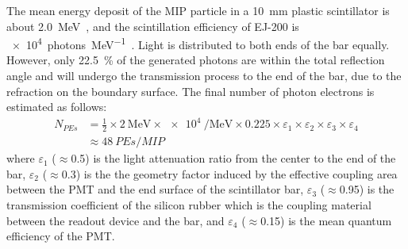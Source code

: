 \documentclass[preprint, times]{elsarticle}
\begin{document}
The mean energy deposit of the MIP particle in a \SI{10}{\milli\meter} plastic scintillator is about \SI{2.0}{\mega\electronvolt}~\cite{olive_review_2014}, and the scintillation efficiency of EJ-200 is \SI[per-mode=symbol]{e4}{photons\per\mega\electronvolt}~\cite{scintillator}.
Light is distributed to both ends of the bar equally.
However, only \SI{22.5}{\percent} of the generated photons are within the total reflection angle and will undergo the transmission process to the end of the bar, due to the refraction on the boundary surface.
The final number of photon electrons is estimated as follows:
\begin{align}
 N_{PEs} &= \frac{1}{2} \times \SI[per-mode=symbol]{2}{\mega\electronvolt} \times \SI{e4}{\per\mega\electronvolt} \times 0.225
           \times \varepsilon_{1} \times \varepsilon_{2} \times \varepsilon_{3} \times \varepsilon_{4} \nonumber \\
         &\approx \SI{48}{PEs\per{MIP}}
\label{eq:pes}
\end{align}
where $\varepsilon_1$ ($\approx$0.5) is the light attenuation ratio from the center to the end of the bar,
$\varepsilon_2$ ($\approx$0.3) is the the geometry factor induced by the effective coupling area between the PMT and the end surface of the scintillator bar,
$\varepsilon_3$ ($\approx$0.95) is the transmission coefficient of the silicon rubber which is the coupling material between the readout device and the bar,
and $\varepsilon_4$ ($\approx$0.15) is the mean quantum efficiency of the PMT.
\end{document}
